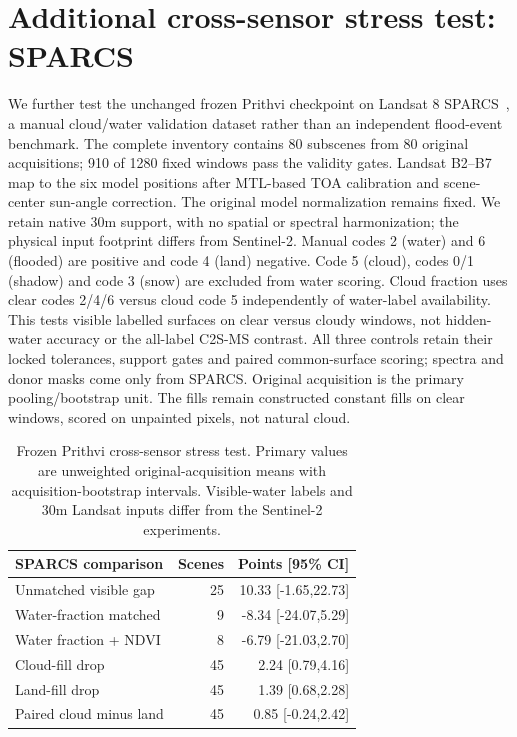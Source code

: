 \section{Additional cross-sensor stress test: SPARCS}
\label{sec:sparcs}
We further test the unchanged frozen Prithvi checkpoint on Landsat 8 SPARCS~\cite{sparcs}, a manual cloud/water validation dataset rather than an independent flood-event benchmark.
The complete inventory contains 80 subscenes from 80 original acquisitions; 910 of 1280 fixed windows pass the validity gates.
Landsat B2--B7 map to the six model positions after MTL-based TOA calibration and scene-center sun-angle correction. The original model normalization remains fixed. We retain native 30m support, with no spatial or spectral harmonization; the physical input footprint differs from Sentinel-2.
Manual codes 2 (water) and 6 (flooded) are positive and code 4 (land) negative. Code 5 (cloud), codes 0/1 (shadow) and code 3 (snow) are excluded from water scoring. Cloud fraction uses clear codes 2/4/6 versus cloud code 5 independently of water-label availability. This tests visible labelled surfaces on clear versus cloudy windows, not hidden-water accuracy or the all-label C2S-MS contrast.
All three controls retain their locked tolerances, support gates and paired common-surface scoring; spectra and donor masks come only from SPARCS. Original acquisition is the primary pooling/bootstrap unit. The fills remain constructed constant fills on clear windows, scored on unpainted pixels, not natural cloud.
\begin{table}[t]
\centering\footnotesize
\setlength{\tabcolsep}{3pt}
\begin{tabular}{lrr}
\toprule
SPARCS comparison & Scenes & Points [95\% CI]\\
\midrule
Unmatched visible gap &25&10.33 [-1.65,22.73]\\
Water-fraction matched &9&-8.34 [-24.07,5.29]\\
Water fraction + NDVI &8&-6.79 [-21.03,2.70]\\
Cloud-fill drop &45&2.24 [0.79,4.16]\\
Land-fill drop &45&1.39 [0.68,2.28]\\
Paired cloud minus land &45&0.85 [-0.24,2.42]\\
\bottomrule
\end{tabular}
\caption{Frozen Prithvi cross-sensor stress test. Primary values are unweighted original-acquisition means with acquisition-bootstrap intervals. Visible-water labels and 30m Landsat inputs differ from the Sentinel-2 experiments.}
\label{tab:sparcs}
\end{table}
